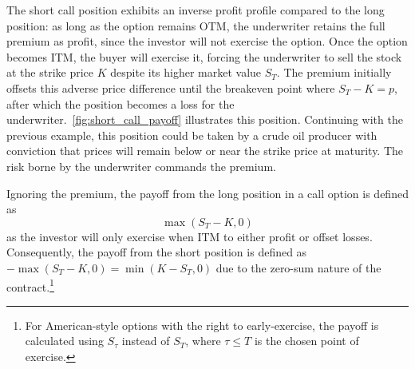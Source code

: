 \documentclass[english,12pt,a4paper,pdftex,sci,utf8]{aaltothesis}
\begin{document}
The short call position exhibits an inverse profit profile compared to the long position: as long as the option remains OTM, the underwriter retains the full premium as profit, since the investor will not exercise the option. Once the option becomes ITM, the buyer will exercise it, forcing the underwriter to sell the stock at the strike price $K$ despite its higher market value $S_T$. The premium initially offsets this adverse price difference until the breakeven point where $S_T-K=p$, after which the position becomes a loss for the underwriter.~\cref{fig:short_call_payoff} illustrates this position. Continuing with the previous example, this position could be taken by a crude oil producer with conviction that prices will remain below or near the strike price at maturity. The risk borne by the underwriter commands the premium.

Ignoring the premium, the payoff from the long position in a call option is defined as
\begin{equation}
    \max(S_T-K,0)
\label{eq:long_call_payoff}
\end{equation}
as the investor will only exercise when ITM to either profit or offset losses. Consequently, the payoff from the short position is defined as $-\max(S_T-K,0) = \min(K-S_T,0)$ due to the zero-sum nature of the contract.\footnote{For American-style options with the right to early-exercise, the payoff is calculated using $S_\tau$ instead of $S_T$, where $\tau \le T$ is the chosen point of exercise.}\cite{hull2016options}
\end{document}
